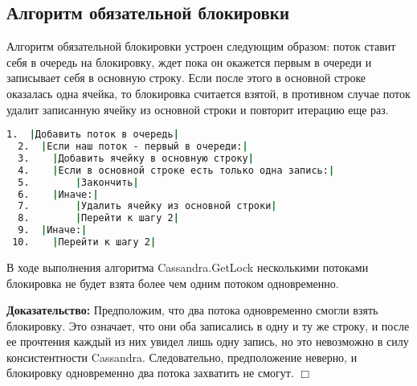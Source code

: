 \subsection{Алгоритм обязательной блокировки}

Алгоритм обязательной блокировки устроен следующим образом: поток ставит себя в очередь на блокировку, ждет пока он окажется первым в очереди и записывает себя в основную строку. Если после этого в основной строке оказалась одна ячейка, то блокировка считается взятой, в противном случае поток удалит записанную ячейку из основной строки и повторит итерацию еще раз.

\begin{lstlisting}[language=csh,caption={Алгоритм Cassandra.GetLock(lockId, threadId)}]
  1.  |Добавить поток в очередь|
  2.  |Если наш поток - первый в очереди:|
  3.  	|Добавить ячейку в основную строку|
  4.  	|Если в основной строке есть только одна запись:|
  5.  		|Закончить|
  6.  	|Иначе:|
  7.  		|Удалить ячейку из основной строки|
  8.  		|Перейти к шагу 2|
  9.  |Иначе:|
 10.  	|Перейти к шагу 2|

\end{lstlisting}

\begin{theorem}
В ходе выполнения алгоритма Cassandra.GetLock несколькими потоками блокировка не будет взята более чем одним потоком одновременно.
\end{theorem}
\textbf{Доказательство:}
Предположим, что два потока одновременно смогли взять блокировку. Это означает, что они оба записались в одну и ту же строку, и после ее прочтения каждый из них увидел лишь одну запись, но это невозможно в силу консистентности Cassandra. Следовательно, предположение неверно, и блокировку одновременно два потока захватить не смогут.
$\Box$